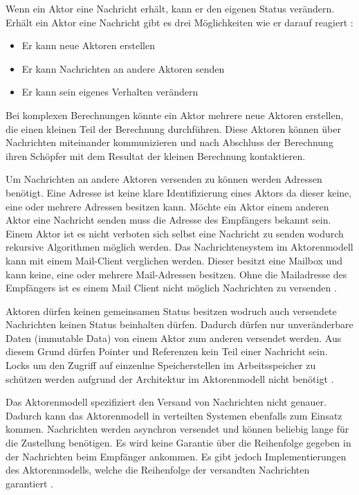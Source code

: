 Wenn ein Aktor eine Nachricht erhält, kann er den eigenen Status verändern. Erhält ein Aktor eine Nachricht gibt es drei Möglichkeiten wie er darauf reagiert \cite[p. 84]{Erb2012}:

\begin{itemize}
  \item Er kann neue Aktoren erstellen
  \item Er kann Nachrichten an andere Aktoren senden
  \item Er kann sein eigenes Verhalten verändern
\end{itemize}

Bei komplexen Berechnungen könnte ein Aktor mehrere neue Aktoren erstellen, die einen kleinen Teil der Berechnung durchführen. Diese Aktoren können über Nachrichten miteinander kommunizieren und nach Abschluss der Berechnung ihren Schöpfer mit dem Resultat der kleinen Berechnung kontaktieren. 

Um Nachrichten an andere Aktoren versenden zu können werden Adressen benötigt. Eine Adresse ist keine klare Identifizierung eines Aktors da dieser keine, eine oder mehrere Adressen besitzen kann. Möchte ein Aktor einem anderen Aktor eine Nachricht senden muss die Adresse des Empfängers bekannt sein. Einem Aktor ist es nicht verboten sich selbst eine Nachricht zu senden wodurch rekursive Algorithmen möglich werden. Das Nachrichtensystem im Aktorenmodell kann mit einem Mail-Client verglichen werden. Dieser besitzt eine Mailbox und kann keine, eine oder mehrere Mail-Adressen besitzen. Ohne die Mailadresse des Empfängers ist es einem Mail Client nicht möglich Nachrichten zu versenden \cite[p. 85]{Erb2012}. 

Aktoren dürfen keinen gemeinsamen Status besitzen wodruch auch versendete Nachrichten keinen Status beinhalten dürfen. Dadurch dürfen nur unveränderbare Daten (immutable Data) von einem Aktor zum anderen versendet werden. Aus diesem Grund dürfen Pointer und Referenzen kein Teil einer Nachricht sein. Locks um den Zugriff auf einzenlne Speicherstellen im Arbeitsspeicher zu schützen werden aufgrund der Architektur im Aktorenmodell  nicht benötigt \cite[p. 85]{Erb2012}.

Das Aktorenmodell spezifiziert den Versand von Nachrichten nicht genauer. Dadurch kann das Aktorenmodell in verteilten Systemen ebenfalls zum Einsatz kommen. Nachrichten werden asynchron versendet und können beliebig lange für die Zustellung benötigen. Es wird keine Garantie über die Reihenfolge gegeben in der Nachrichten beim Empfänger ankommen. Es gibt jedoch Implementierungen des Aktorenmodells, welche die Reihenfolge der versandten Nachrichten garantiert \cite[p. 85]{Erb2012}.


